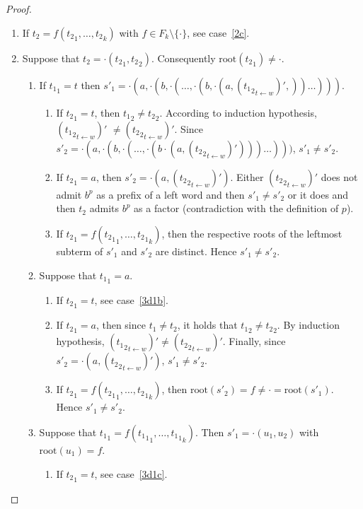 \documentclass[a4paper]{llncs}
\begin{document}
\begin{proof}
\begin{enumerate}
\begin{enumerate}
    \item If $t_2=f({t_2}_1,\ldots,{t_2}_k)$ with $f\in F_k\setminus\{\cdot\}$, see case~\ref{2c}.
    
    \item Suppose that $t_2=\cdot({t_2}_1,{t_2}_2)$. Consequently $\mathrm{root}({t_2}_1)\neq\cdot$.
    
    \begin{enumerate}
    \item If ${t_1}_1=t$ then $s'_1=\cdot(a,\cdot(b,\cdot(\ldots,\cdot(b,\cdot(a,({{t_1}_2}_{t\leftarrow w})',))\ldots)))$.
    \begin{enumerate}
    \item If ${t_2}_1=t$, then ${t_1}_2\neq {t_2}_2$. According to induction hypothesis, $({{t_1}_2}_{t\leftarrow w})'$ $\neq ({{t_2}_2}_{t\leftarrow w})'$. Since $s'_2=\cdot(a,\cdot(b,\cdot(\ldots,\cdot(b\cdot(a,({{t_2}_2}_{t\leftarrow w})')))\ldots)))$, $s'_1\neq s'_2$.
    
    \item\label{3d1b} If ${t_2}_1=a$, then $s'_2=\cdot (a,({{t_2}_2}_{t\leftarrow w})')$. Either $({{t_2}_2}_{t\leftarrow w})'$ does not admit $b^p$ as a prefix of a left word and then $s'_1\neq s'_2$ or it does and then $t_2$ admits $b^p$ as a factor (contradiction with the definition of $p$).
    
    \item\label{3d1c} If ${t_2}_1=f({{t_2}_1}_1,\ldots, {{t_2}_1}_k)$, then the respective roots of the leftmost subterm of  $s'_1$ and $s'_2$ are distinct. Hence $s'_1\neq s'_2$.
    
    \end{enumerate}
    \item Suppose that ${t_1}_1=a$.
    
    \begin{enumerate}
    \item If ${t_2}_1=t$, see case~\ref{3d1b}.
    
    \item If ${t_2}_1=a$, then since $t_1\neq t_2$, it holds that ${t_{1}}_2\neq {t_2}_2$. By induction hypothesis, $({{t_1}_2}_{t\leftarrow w})'\neq ({{t_2}_2}_{t\leftarrow w})'$. Finally, since $s'_2=\cdot(a,({{t_2}_2}_{t\leftarrow w})')$, $s'_1\neq s'_2$.
    
    \item If ${t_2}_1=f({{t_2}_1}_1,\ldots, {{t_2}_1}_k)$, then $\mathrm{root}(s'_2)=f\neq \cdot=\mathrm{root}(s'_1)$. Hence $s'_1\neq s'_2$.
    \end{enumerate}
    \item Suppose that ${t_1}_1=f({{t_1}_1}_1,\ldots,{{t_1}_1}_k)$. Then $s'_1=\cdot(u_1,u_2)$ with $\mathrm{root}(u_1)=f$.
    \begin{enumerate}
    \item If ${t_2}_1=t$, see case~\ref{3d1c}.
    

\end{enumerate}
\end{enumerate}
\end{enumerate}
\end{enumerate}
\end{proof}
\end{document}
